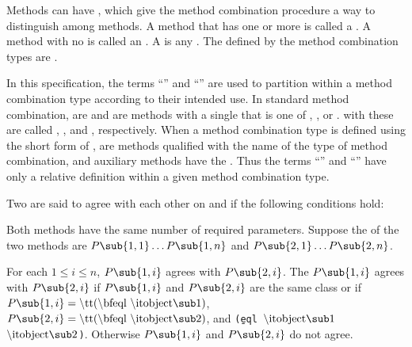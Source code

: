 Methods can have , which give the method combination
procedure a way to distinguish among methods.  A method that has one
or more  is called a .
A method with no  is called an . 
A  is any .
The  defined by the  method combination types 
are .

In this specification, the terms ``'' and 
``'' are used to partition 
within a method combination type according to their intended use.  
In standard method combination,  are 
and  are methods with a single  
that is one of , , or .
 with these  are called ,
, and , respectively.
When a method combination type is defined using the short form of
,  are 
methods qualified with the name of the type of method combination, 
and auxiliary methods have the  .
Thus the terms ``'' and ``''
have only a relative definition within a given method combination type.

\endSubsection%


Two  are said to agree with each other on 
and  if the following conditions hold:

\beginlist

 Both methods have the same number of required parameters.
Suppose the  of the two methods are
$P\sub{1,1}\ldots P\sub{1,n}$ and $P\sub{2,1}\ldots P\sub{2,n}$.

 For each $1\leq i\leq n$, $P\sub{1,i}$ agrees with $P\sub{2,i}$.
The  $P\sub{1,i}$ agrees with $P\sub{2,i}$ if
$P\sub{1,i}$ and $P\sub{2,i}$ are the same class or if 
$P\sub{1,i}=\hbox{{\tt(\b{eql} $\hbox{\i{object}}\sub 1$)}}$,
$P\sub{2,i}=\hbox{{\tt(\b{eql} $\hbox{\i{object}}\sub 2$)}}$, and
{\tt (\b{eql} $\hbox{\i{object}}\sub 1$ $\hbox{\i{object}}\sub 2$)}.
Otherwise $P\sub{1,i}$ and $P\sub{2,i}$ do not agree.


